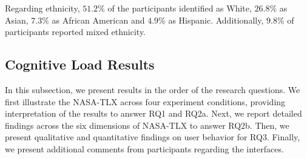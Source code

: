 Regarding ethnicity, $51.2\%$ of the participants identified as White, $26.8\%$ as Asian, $7.3\%$ as African American and $4.9\%$ as Hispanic. Additionally, $9.8\%$ of participants reported mixed ethnicity.

\subsection{Cognitive Load Results}
In this subsection, we present results in the order of the research questions. We first illustrate the NASA-TLX across four experiment conditions, providing interpretation of the results to answer RQ1 and RQ2a. Next, we report detailed findings across the six dimensions of NASA-TLX to answer RQ2b. Then, we present qualitative and quantitative findings on user behavior for RQ3. Finally, we present additional comments from participants regarding the interfaces.

